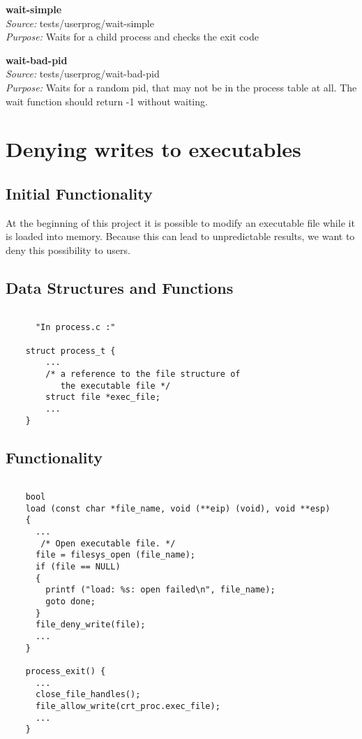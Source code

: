       \textbf{wait-simple}\\
      \textit{Source:} tests/userprog/wait-simple\\
      \textit{Purpose:} Waits for a child process and checks the exit code

      \textbf{wait-bad-pid} \\
      \textit{Source:} tests/userprog/wait-bad-pid\\
      \textit{Purpose:} Waits for a random pid, that may not be in the process table at all. The wait function should return -1 without waiting.
    
\section{Denying writes to executables}

     \subsection{Initial Functionality}

	At the beginning of this project it is possible to modify an executable file while it is loaded into memory. Because this can lead to unpredictable results, we want to deny this possibility to users.

    \subsection{Data Structures and Functions}

    \begin{lstlisting}

      "In process.c :"
	
	struct process_t {
	    ...
	    /* a reference to the file structure of 
	       the executable file */
	    struct file *exec_file;
	    ...
	}

    \end{lstlisting}


    \subsection{Functionality}
   \begin{lstlisting}

	bool
	load (const char *file_name, void (**eip) (void), void **esp) 
	{
	  ...
	   /* Open executable file. */
	  file = filesys_open (file_name);
	  if (file == NULL) 
	  {
	    printf ("load: %s: open failed\n", file_name);
	    goto done; 
	  }
	  file_deny_write(file);
	  ...
	}

	process_exit() {
	  ...
	  close_file_handles();
	  file_allow_write(crt_proc.exec_file);
	  ...
	}	
    \end{lstlisting}

